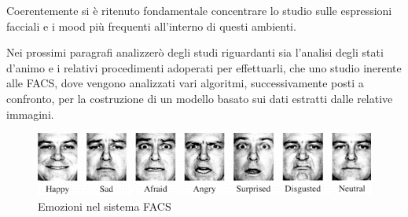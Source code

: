 \begin{preface}
    Coerentemente si è ritenuto fondamentale concentrare lo studio sulle espressioni facciali e i mood più frequenti all’interno di questi ambienti.
    
    Nei prossimi paragrafi analizzerò degli studi riguardanti sia l’analisi degli stati d’animo e i relativi procedimenti adoperati per effettuarli, che uno studio inerente alle FACS, dove vengono analizzati vari algoritmi, successivamente posti a confronto, per la costruzione di un modello basato sui dati estratti dalle relative immagini.
    
    \begin{figure}
        \includegraphics[width=1\linewidth]{images/1.png}
        \caption{Emozioni nel sistema FACS}
    \end{figure}
\end{preface}